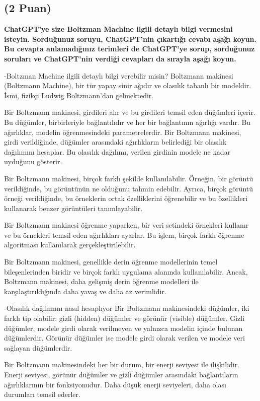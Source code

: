 \documentclass[11pt]{article}
\begin{document}
\subsection{(2 Puan)} \textbf{ChatGPT’ye size Boltzman Machine ilgili detaylı bilgi vermesini isteyin. Sorduğunuz soruyu, ChatGPT'nin çıkartığı cevabı aşağı koyun. Bu cevapta anlamadığınız terimleri de ChatGPT’ye sorup, sorduğunuz soruları ve ChatGPT’nin verdiği cevapları da sırayla aşağı koyun.}

-Boltzman Machine ilgili detaylı bilgi verebilir misin?
Boltzmann makinesi (Boltzmann Machine), bir tür yapay sinir ağıdır ve olasılık tabanlı bir modeldir. İsmi, fizikçi Ludwig Boltzmann'dan gelmektedir.

Bir Boltzmann makinesi, girdileri alır ve bu girdileri temsil eden düğümleri içerir. Bu düğümler, birbirleriyle bağlantılıdır ve her bir bağlantının ağırlığı vardır. Bu ağırlıklar, modelin öğrenmesindeki parametrelerdir. Bir Boltzmann makinesi, girdi verildiğinde, düğümler arasındaki ağırlıkların belirlediği bir olasılık dağılımını hesaplar. Bu olasılık dağılımı, verilen girdinin modele ne kadar uyduğunu gösterir.

Bir Boltzmann makinesi, birçok farklı şekilde kullanılabilir. Örneğin, bir görüntü verildiğinde, bu görüntünün ne olduğunu tahmin edebilir. Ayrıca, birçok görüntü örneği verildiğinde, bu örneklerin ortak özelliklerini öğrenebilir ve bu özellikleri kullanarak benzer görüntüleri tanımlayabilir.

Bir Boltzmann makinesi öğrenme yaparken, bir veri setindeki örnekleri kullanır ve bu örnekleri temsil eden ağırlıkları ayarlar. Bu işlem, birçok farklı öğrenme algoritması kullanılarak gerçekleştirilebilir.

Bir Boltzmann makinesi, genellikle derin öğrenme modellerinin temel bileşenlerinden biridir ve birçok farklı uygulama alanında kullanılabilir. Ancak, Boltzmann makinesi, daha gelişmiş derin öğrenme modelleri ile karşılaştırıldığında daha yavaş ve daha az verimlidir.

-Olasılık dağılımını nasıl hesaplıyor
Bir Boltzmann makinesindeki düğümler, iki farklı tip olabilir: gizli (hidden) düğümler ve görünür (visible) düğümler. Gizli düğümler, modele girdi olarak verilmeyen ve yalnızca modelin içinde bulunan düğümlerdir. Görünür düğümler ise modele girdi olarak verilen ve modele veri sağlayan düğümlerdir.

Bir Boltzmann makinesindeki her bir durum, bir enerji seviyesi ile ilişkilidir. Enerji seviyesi, görünür düğümler ve gizli düğümler arasındaki bağlantıların ağırlıklarının bir fonksiyonudur. Daha düşük enerji seviyeleri, daha olası durumları temsil ederler.
\end{document}
